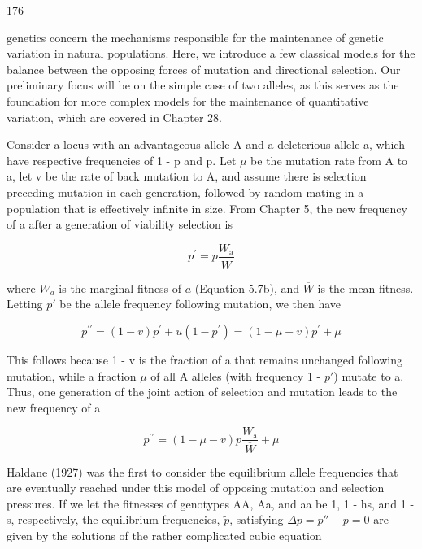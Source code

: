 \documentclass{article}
\begin{document}
176

genetics concern the mechanisms responsible for the maintenance of genetic variation in natural populations. Here, we introduce a few classical models for the balance between the opposing forces of mutation and directional selection. Our preliminary focus will be on the simple case of two alleles, as this serves as the foundation for more complex models for the maintenance of quantitative variation, which are covered in Chapter 28.

Consider a locus with an advantageous allele A and a deleterious allele a, which have respective frequencies of 1 - p and p. Let  $ \mu $ be the mutation rate from A to a, let v be the rate of back mutation to A, and assume there is selection preceding mutation in each generation, followed by random mating in a population that is effectively infinite in size. From Chapter 5, the new frequency of a after a generation of viability selection is

\begin{equation}
p^{\prime}=p\frac{W_{\mathrm{a}}}{\overline{W}}
\tag{7.1}
\label{eq:7_1}
\end{equation}

where  $ W_a $ is the marginal fitness of  $ a $ (Equation 5.7b), and  $ \overline{W} $ is the mean fitness. Letting  $ p' $ be the allele frequency following mutation, we then have

\begin{equation}
p^{\prime \prime}=(1-v)p^{\prime}+u(1-p^{\prime})=(1-\mu-v)p^{\prime}+\mu
\tag{7.2}
\label{eq:7_2}
\end{equation}

This follows because 1 - v is the fraction of a that remains unchanged following mutation, while a fraction  $ \mu $ of all A alleles (with frequency 1 -  $ p' $) mutate to a. Thus, one generation of the joint action of selection and mutation leads to the new frequency of a

\begin{equation}
p^{\prime\prime}=(1-\mu-v)p\frac{W_{\mathrm{a}}}{\overline{W}}+\mu
\tag{7.3}
\label{eq:7_3}
\end{equation}

Haldane (1927) was the first to consider the equilibrium allele frequencies that are eventually reached under this model of opposing mutation and selection pressures. If we let the fitnesses of genotypes AA, Aa, and aa be 1, 1 - hs, and 1 - s, respectively, the equilibrium frequencies,  $ \widetilde{p} $, satisfying  $ \Delta p = p'' - p = 0 $ are given by the solutions of the rather complicated cubic equation
\end{document}
